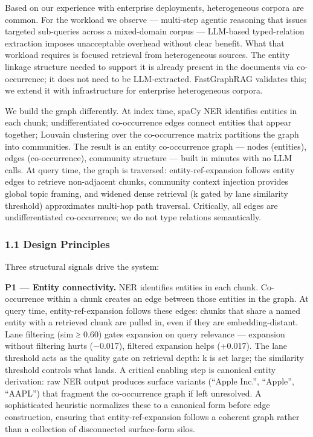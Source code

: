 Based on our experience with enterprise deployments, heterogeneous corpora are common. For the workload we observe --- multi-step agentic reasoning that issues targeted sub-queries across a mixed-domain corpus --- LLM-based typed-relation extraction imposes unacceptable overhead without clear benefit. What that workload requires is focused retrieval from heterogeneous sources. The entity linkage structure needed to support it is already present in the documents via co-occurrence; it does not need to be LLM-extracted. FastGraphRAG validates this; we extend it with infrastructure for enterprise heterogeneous corpora.

We build the graph differently. At index time, spaCy NER identifies entities in each chunk; undifferentiated co-occurrence edges connect entities that appear together; Louvain clustering over the co-occurrence matrix partitions the graph into communities. The result is an entity co-occurrence graph --- nodes (entities), edges (co-occurrence), community structure --- built in minutes with no LLM calls. At query time, the graph is traversed: entity-ref-expansion follows entity edges to retrieve non-adjacent chunks, community context injection provides global topic framing, and widened dense retrieval (k gated by lane similarity threshold) approximates multi-hop path traversal. Critically, all edges are undifferentiated co-occurrence; we do not type relations semantically.

\subsubsection{1.1 Design Principles}\label{design-principles}

Three structural signals drive the system:

\textbf{P1 --- Entity connectivity.} NER identifies entities in each chunk. Co-occurrence within a chunk creates an edge between those entities in the graph. At query time, entity-ref-expansion follows these edges: chunks that share a named entity with a retrieved chunk are pulled in, even if they are embedding-distant. Lane filtering (sim ≥ 0.60) gates expansion on query relevance --- expansion without filtering hurts (−0.017), filtered expansion helps (+0.017). The lane threshold acts as the quality gate on retrieval depth: k is set large; the similarity threshold controls what lands. A critical enabling step is canonical entity derivation: raw NER output produces surface variants (``Apple Inc.'', ``Apple'', ``AAPL'') that fragment the co-occurrence graph if left unresolved. A sophisticated heuristic normalizes these to a canonical form before edge construction, ensuring that entity-ref-expansion follows a coherent graph rather than a collection of disconnected surface-form silos.

